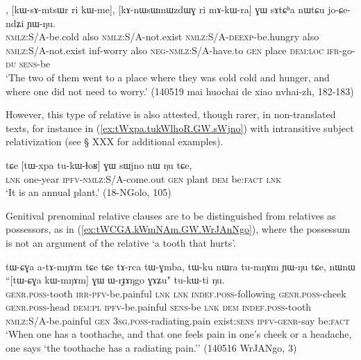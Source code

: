 \begin{exe}
\ex \label{ex:makWra.GW.sAtCha}
\gll [kɯ-ɣɤndʐo ri kɯ-me], [kɯ-sɤ-mtsɯr ri kɯ-me], [kɤ-nɯsɯmɯzdɯɣ ri mɤ-kɯ-ra] ɣɯ sɤtɕʰa nɯtɕu jo-ɕe-ndʑi ɲɯ-ŋu. \\
\textsc{nmlz}:S/A-be.cold also \textsc{nmlz}:S/A-not.exist \textsc{nmlz}:S/A-\textsc{deexp}-be.hungry also \textsc{nmlz}:S/A-not.exist inf-worry also \textsc{neg}-\textsc{nmlz}:S/A-have.to \textsc{gen} place \textsc{dem}:\textsc{loc} \textsc{ifr}-go-\textsc{du} \textsc{sens}-be \\
\glt  `The two of them went to a place where they was cold cold and hunger, and where one did not need to worry.' (140519 mai huochai de xiao nvhai-zh, 182-183)
\end{exe}

However, this type of relative is also attested, though rarer, in non-translated texts, for instance in (\ref{ex:tWxpa.tukWlhoR.GW.sWjno}) with intransitive subject relativization (see § XXX for additional examples).

\begin{exe}
\ex \label{ex:tWxpa.tukWlhoR.GW.sWjno}
\gll  tɕe [tɯ-xpa tu-kɯ-ɬoʁ] ɣɯ sɯjno nɯ ŋu tɕe, \\
\textsc{lnk} one-year \textsc{ipfv}-\textsc{nmlz}:S/A-come.out \textsc{gen} plant \textsc{dem} be:\textsc{fact} \textsc{lnk} \\
\glt  `It is an annual plant.' (18-NGolo, 105)
\end{exe}

Genitival prenominal relative clauses are to be distinguished from relatives as possessors, as in (\ref{ex:tWCGA.kWmNAm.GW.WrJAnNgo}), where the possessum   is not an argument of the relative  `a tooth that hurts'. 

\begin{exe}
\ex \label{ex:tWCGA.kWmNAm.GW.WrJAnNgo}
\gll tɯ-ɕɣa a-tɤ-mŋɤm tɕe tɕe tɤ-rca tɯ-ɣmba, tɯ-ku nɯra tu-mŋɤm ɲɯ-ŋu tɕe,  nɯnɯ ``[tɯ-ɕɣa kɯ-mŋɤm] ɣɯ ɯ-rɟɤŋgo ɣɤʑu" tu-kɯ-ti ŋu. \\
\textsc{genr}.\textsc{poss}-tooth \textsc{irr}-\textsc{pfv}-be.painful \textsc{lnk} \textsc{lnk} \textsc{indef}.\textsc{poss}-following \textsc{genr}.\textsc{poss}-cheek \textsc{genr}.\textsc{poss}-head \textsc{dem}:\textsc{pl} \textsc{ipfv}-be.painful \textsc{sens}-be \textsc{lnk} \textsc{dem} \textsc{indef}.\textsc{poss}-tooth \textsc{nmlz}:S/A-be.painful \textsc{gen} \textsc{3sg}.\textsc{poss}-radiating.pain exist:\textsc{sens} \textsc{ipfv}-\textsc{genr}-say be:\textsc{fact} \\
\glt `When one has a toothache, and that one feels pain in one's cheek or a headache, one says `the toothache has a radiating pain.'' (140516 WrJANgo, 3)
\end{exe}


